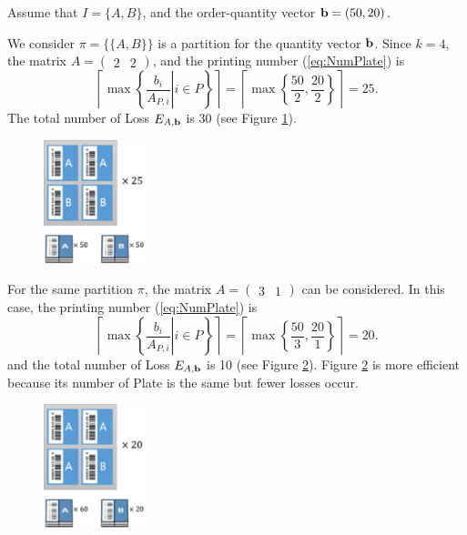 \begin{example}
	Assume that $I=\{A,B\}$, and the order-quantity vector ${\bf b}=(50,20)$.
	
	We consider $\pi = \{\{A,B\}\}$ is a partition for the quantity vector ${\bf b}$. Since $k = 4$, 
	the matrix $A = (\begin{array}{cc}2 & 2\end{array})$, and the printing number (\ref{eq:NumPlate}) is 
	\begin{equation}
	\left\lceil \max\left\{ \left. \frac{b_{i}}{A_{P,i}} \right| i \in P \right\} \right\rceil = \left\lceil \max \left\{ \frac{50}{2}, \frac{20}{2} \right\} \right\rceil = 25.
	\end{equation}
	The total number of Loss $E_{A,{\bf b}}$ is 30 (see Figure \ref{fig:ex21}).
	
	\begin{figure}[h!]
		\centering
		\includegraphics[width=3cm]{ex21.pdf}
		\caption{}
		\label{fig:ex21}       %
	\end{figure}
	
	For the same partition $\pi$, the matrix $A = (\begin{array}{cc}3 & 1\end{array})$ can be considered. In this case, the printing number (\ref{eq:NumPlate}) is 
	\begin{equation}
	\left\lceil \max\left\{ \left. \frac{b_{i}}{A_{P,i}} \right| i \in P \right\} \right\rceil = \left\lceil \max \left\{ \frac{50}{3}, \frac{20}{1} \right\} \right\rceil = 20.
	\end{equation}
	and the total number of Loss $E_{A,{\bf b}}$ is 10 (see Figure \ref{fig:ex22}).
	Figure \ref{fig:ex22} is more efficient because its number of Plate is the same but fewer losses occur.
	\begin{figure}[h!]
		\centering
		\includegraphics[width=3cm]{ex22.pdf}
		\caption{}
		\label{fig:ex22}       %
	\end{figure}
\end{example}

